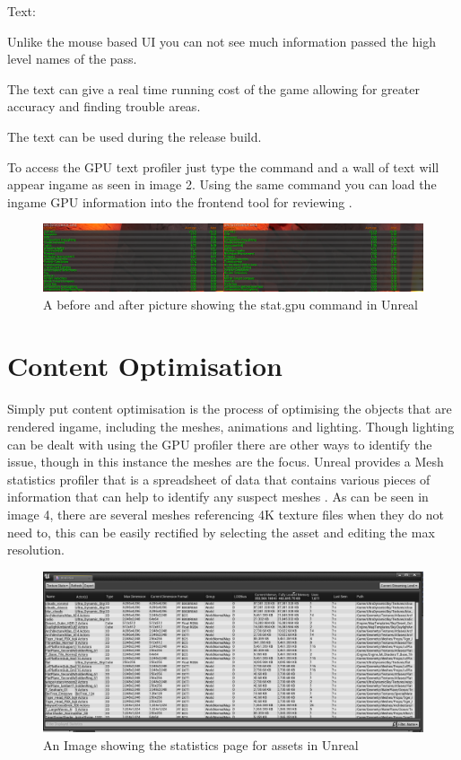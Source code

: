 \documentclass{scrartcl}
\begin{document}
Text:
\begin{description}[font=$\bullet$~\normalfont\scshape\color{red!50!black}]
\item Unlike the mouse based UI you can not see much information passed the high level names of the pass.
\item The text can give a real time running cost of the game allowing for greater accuracy and finding trouble areas.
\item The text can be used during the release build.
\end{description}

To access the GPU text profiler just type the command  and a wall of text will appear ingame as seen in image 2. Using the same  command you can load the ingame GPU information into the frontend tool for reviewing \cite{UEGPU}.

\begin{figure}[h]
	\centering
	\includegraphics[width=\textwidth]{Image2}
	\caption{A before and after picture showing the stat.gpu command in Unreal}
	\label{Image2}
\end{figure}

\section{Content Optimisation}
Simply put content optimisation is the process of optimising the objects that are rendered ingame, including the meshes, animations and lighting. Though lighting can be dealt with using the GPU profiler there are other ways to identify the issue,	 though in this instance the meshes are the focus. Unreal provides a Mesh statistics profiler that is a spreadsheet of data that contains various pieces of information that can help to identify any suspect meshes \cite{Content}. As can be seen in image 4, there are several meshes referencing 4K texture files when they do not need to, this can be easily rectified by selecting the asset and editing the max resolution.

\begin{figure}[h]
	\centering
	\includegraphics[width=\textwidth]{Image3}
	\caption{An Image showing the statistics page for assets in Unreal}
	\label{Image3}
\end{figure}
\end{document}
